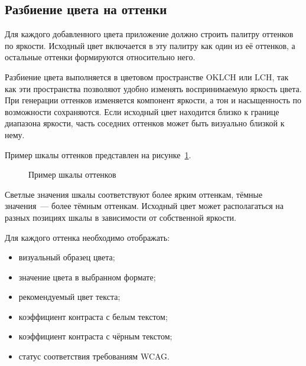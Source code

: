 \subsection*{Разбиение цвета на оттенки}

Для каждого добавленного цвета приложение должно строить палитру оттенков по яркости. Исходный цвет включается в эту палитру как один из её оттенков, а остальные оттенки формируются относительно него.

Разбиение цвета выполняется в цветовом пространстве OKLCH или LCH, так как эти пространства позволяют удобно изменять воспринимаемую яркость цвета. При генерации оттенков изменяется компонент яркости, а тон и насыщенность по возможности сохраняются. Если исходный цвет находится близко к границе диапазона яркости, часть соседних оттенков может быть визуально близкой к нему.

Пример шкалы оттенков представлен на рисунке~\ref{fig:shade-scale}.

\begin{figure}[h]
    \centering
    \caption{Пример шкалы оттенков}
    \label{fig:shade-scale}
\end{figure}

Светлые значения шкалы соответствуют более ярким оттенкам, тёмные значения~--- более тёмным оттенкам. Исходный цвет может располагаться на разных позициях шкалы в зависимости от собственной яркости.

Для каждого оттенка необходимо отображать:

\begin{itemize}
    \item визуальный образец цвета;
    \item значение цвета в выбранном формате;
    \item рекомендуемый цвет текста;
    \item коэффициент контраста с белым текстом;
    \item коэффициент контраста с чёрным текстом;
    \item статус соответствия требованиям WCAG.
\end{itemize}

